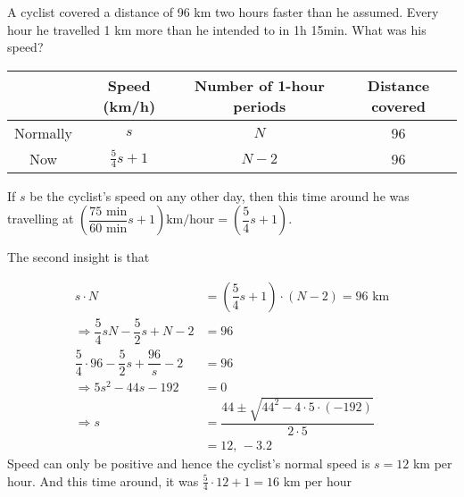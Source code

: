 

\question[5] A cyclist covered a distance of 96 km two hours faster than he assumed. Every hour
he travelled 1 km more than he intended to in 1h 15min. What was his speed?


\ifprintanswers
  	\begin{tabular}{cccc}
  	    \toprule
  		& Speed (km/h) & Number of 1-hour periods & Distance covered \\
  		\midrule
  		Normally & $s$ & $N$ & 96 \\
  		Now & $\frac{5}{4}s + 1$ & $N-2$ & 96 \\
  		\bottomrule
  	
  	\end{tabular}
\fi 

\begin{solution}[\fullpage]
	If $s$ be the cyclist's speed on any other day, then this time around he was 
	travelling at $\left(\dfrac{75\text{ min}}{60\text{ min}}s + 1\right) \text{km/hour} = \left(\dfrac{5}{4}s + 1\right)$.
	
	The second insight is that 
	
	\begin{align}
		s\cdot N &= \left( \dfrac{5}{4}s + 1 \right)\cdot (N-2) = 96\text{ km} \\
		\Rightarrow \dfrac{5}{4}sN - \dfrac{5}{2}s + N - 2 &= 96 \\
		\dfrac{5}{4}\cdot 96 - \dfrac{5}{2}s + \dfrac{96}{s} - 2 &= 96 \\
		\Rightarrow 5s^2 - 44s - 192 &= 0 \\
		\Rightarrow s &= \dfrac{44\pm\sqrt{44^2-4\cdot 5 \cdot (-192)}}{2\cdot 5} \\
		              &= 12,\, -3.2
	\end{align}
	Speed can only be positive and hence the cyclist's normal speed is $s = 12$ km per hour.
	And this time around, it was $\frac{5}{4}\cdot 12 + 1 = 16$ km per hour
\end{solution}
